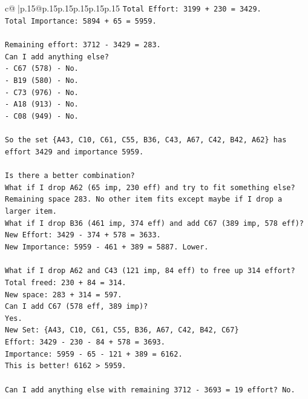 \documentclass{article}
\begin{document}
{\begin{supertabular}{c@{$\;$}|p{.15\linewidth}@{}p{.15\linewidth}p{.15\linewidth}p{.15\linewidth}p{.15\linewidth}p{.15\linewidth}}
{{{\texttt{Total Effort: 3199 + 230 = 3429.} \\
\texttt{Total Importance: 5894 + 65 = 5959.} \\
\\ 
\texttt{Remaining effort: 3712 {-} 3429 = 283.} \\
\texttt{Can I add anything else?} \\
\texttt{{-} C67 (578) {-} No.} \\
\texttt{{-} B19 (580) {-} No.} \\
\texttt{{-} C73 (976) {-} No.} \\
\texttt{{-} A18 (913) {-} No.} \\
\texttt{{-} C08 (949) {-} No.} \\
\\ 
\texttt{So the set \{A43, C10, C61, C55, B36, C43, A67, C42, B42, A62\} has effort 3429 and importance 5959.} \\
\\ 
\texttt{Is there a better combination?} \\
\texttt{What if I drop A62 (65 imp, 230 eff) and try to fit something else?} \\
\texttt{Remaining space 283. No other item fits except maybe if I drop a larger item.} \\
\texttt{What if I drop B36 (461 imp, 374 eff) and add C67 (389 imp, 578 eff)?} \\
\texttt{New Effort: 3429 {-} 374 + 578 = 3633.} \\
\texttt{New Importance: 5959 {-} 461 + 389 = 5887. Lower.} \\
\\ 
\texttt{What if I drop A62 and C43 (121 imp, 84 eff) to free up 314 effort?} \\
\texttt{Total freed: 230 + 84 = 314.} \\
\texttt{New space: 283 + 314 = 597.} \\
\texttt{Can I add C67 (578 eff, 389 imp)?} \\
\texttt{Yes.} \\
\texttt{New Set: \{A43, C10, C61, C55, B36, A67, C42, B42, C67\}} \\
\texttt{Effort: 3429 {-} 230 {-} 84 + 578 = 3693.} \\
\texttt{Importance: 5959 {-} 65 {-} 121 + 389 = 6162.} \\
\texttt{This is better! 6162 > 5959.} \\
\\ 
\texttt{Can I add anything else with remaining 3712 {-} 3693 = 19 effort? No.} \\
}}}
\end{supertabular}}
\end{document}
